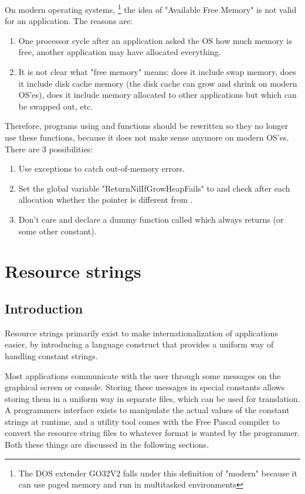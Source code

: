 On modern operating systems, \footnote{The DOS extender GO32V2 falls under this 
definition of "modern" because it can use paged memory and run in 
multitasked environments} the idea of "Available Free Memory" is not valid for an
application.
The reasons are:
\begin{enumerate} 
\item One processor cycle after an application asked the OS how much memory is free,
another application may have allocated everything.
\item It is not clear what "free memory" means: does it include swap memory,
does it include disk cache memory (the disk cache can grow and shrink on
modern OS'es), does it include memory allocated to other applications but
which can be swapped out, etc.
\end{enumerate}

Therefore, programs using  and  functions 
should be rewritten so they no longer use these functions, because
it does not make sense anymore on modern OS'es. There are 3 possibilities:
\begin{enumerate}
\item Use exceptions to catch out-of-memory errors.
\item Set the global variable "ReturnNilIfGrowHeapFails" to 
and check after each allocation whether the pointer is different from
.
\item Don't care and declare a dummy function called  
which always returns  (or some other constant).
\end{enumerate}


\chapter{Resource strings}
\label{resourcestrings}
\section{Introduction}
Resource strings primarily exist to make internationalization of
applications easier, by introducing a language construct that provides
a uniform way of handling constant strings.

Most applications communicate with the user through some messages on the
graphical screen or console. Storing these messages in special constants
allows storing them in a uniform way in separate files, which can be used
for translation. A programmers interface exists to manipulate the actual
values of the constant strings at runtime, and a utility tool comes with the
Free Pascal compiler to convert the resource string files to whatever format
is wanted by the programmer. Both these things are discussed in the
following sections.


